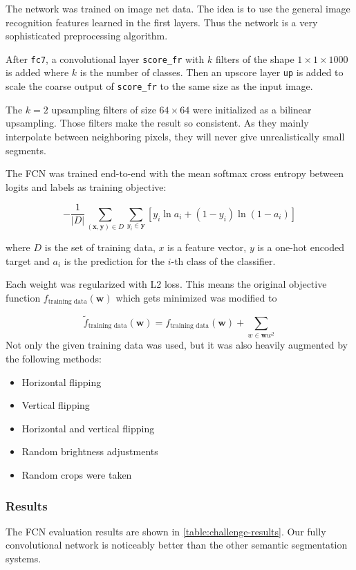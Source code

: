 The network was trained on image net data. The idea is to use the general
image recognition features learned in the first layers. Thus the network is a
very sophisticated preprocessing algorithm.

After \verb+fc7+, a convolutional layer \verb+score_fr+ with $k$ filters of the
shape $1 \times 1 \times 1000$ is added where $k$ is the number of classes.
Then an upscore layer \verb+up+ is added to scale the coarse output of
\verb+score_fr+ to the same size as the input image.

The $k=2$ upsampling filters of size $64 \times 64$ were initialized as a
bilinear upsampling. Those filters make the result so consistent. As they
mainly interpolate between neighboring pixels, they will never give
unrealistically small segments.

The FCN was trained end-to-end with the mean softmax cross entropy
between logits and labels as training objective:

\[- \frac{1}{|D|} \sum_{(\mathbf{x}, \mathbf{y}) \in D} \sum_{y_i \in \mathbf{y}} \left [ y_i \ln a_i + (1-y_i) \ln(1 - a_i)\right ]\]

where $D$ is the set of training data, $x$ is a feature vector, $y$ is a one-hot
encoded target and $a_i$ is the prediction for the $i$-th class of the classifier.

Each weight was regularized with L2 loss. This means the original objective
function $f_\text{training data}(\mathbf{w})$ which gets minimized was modified
to

\[\tilde{f}_\text{training data}(\mathbf{w}) = f_\text{training data}(\mathbf{w}) + \sum_{w \in \mathbf{w} w^2}\]
\clearpage
Not only the given training data was used, but it was also heavily augmented by
the following methods:

\begin{itemize}
    \item Horizontal flipping
    \item Vertical flipping
    \item Horizontal and vertical flipping
    \item Random brightness adjustments
    \item Random crops were taken
\end{itemize}

\subsubsection{Results}
The FCN evaluation results are shown in \cref{table:challenge-results}. Our
fully convolutional network is noticeably better than the other semantic
segmentation systems.

